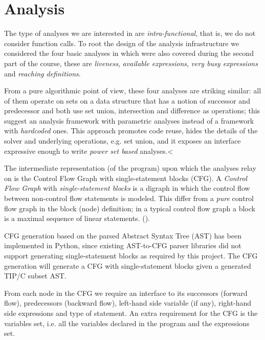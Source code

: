 \section{Analysis}

The type of analyses we are interested in are \emph{intra-functional}, that is, we do not consider function calls. To root the design of the analysis infrastructure
we considered the four basic analyses in \cite{spa} which were also covered during the second part of the course, these are \emph{liveness}, \emph{available expressions},
\emph{very busy expressions} and \emph{reaching definitions}. 

\newpar From a pure algorithmic point of view, these four analyses are striking similar: all of them operate on sets on a data structure that has a notion of successor and predecessor 
and both use set union, intersection and difference as operations; this suggest an analysis framework with parametric analyses instead of a framework with \emph{hardcoded}
ones. This approach promotes code reuse, hides the details of the solver and underlying operations, e.g. set union, and it exposes an interface expressive enough to
write \emph{power set based} analyses.<


\newpar The intermediate representation (of the program) upon which the analyses relay on is the Control Flow Graph with single-statement blocks (CFG). A \emph{Control Flow Graph} with \emph{single-statement blocks} is a digraph in which the control flow between non-control flow statements is modeled. This differ from a \emph{pure} control flow graph in the block (node) definition; in a typical control flow graph a block is a maximal sequence of linear statements. (\cite{cooper}).

\newpar CFG generation based on the parsed Abstract Syntax Tree (AST) has been implemented in Python, since existing AST-to-CFG parser libraries did not support generating single-statement blocks as required by this project. The CFG generation will generate a CFG with single-statement blocks given a generated TIP/C subset AST. 

\newpar From each node in the CFG we require an interface to its successors (forward flow), predecessors (backward flow), left-hand side variable (if any), right-hand side expressions and type of statement.
An extra requirement for the CFG is the variables set, i.e. all the variables declared in the program and the expressions set.

